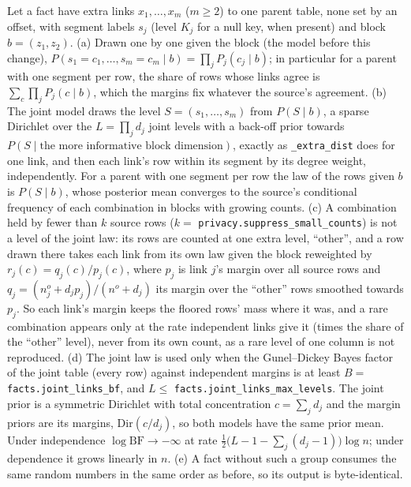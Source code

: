 \setcounter{proposition}{1869}
\begin{proposition}\label{prop:rolelinks}
Let a fact have extra links $x_1,\dots,x_m$ ($m\ge2$) to one parent table, none set by an offset, with segment labels $s_j$ (level $K_j$ for a null key, when present) and block $b=(z_1,z_2)$. (a) Drawn one by one given the block (the model before this change), $P(s_1=c_1,\dots,s_m=c_m\mid b)=\prod_j P_j(c_j\mid b)$; in particular for a parent with one segment per row, the share of rows whose links agree is $\sum_c\prod_j P_j(c\mid b)$, which the margins fix whatever the source's agreement. (b) The joint model draws the level $S=(s_1,\dots,s_m)$ from $P(S\mid b)$, a sparse Dirichlet over the $L=\prod_j d_j$ joint levels with a back-off prior towards $P(S\mid\text{the more informative block dimension})$, exactly as \texttt{\_extra\_dist} does for one link, and then each link's row within its segment by its degree weight, independently. For a parent with one segment per row the law of the rows given $b$ is $P(S\mid b)$, whose posterior mean converges to the source's conditional frequency of each combination in blocks with growing counts. (c) A combination held by fewer than $k$ source rows ($k=$ \texttt{privacy.suppress\_small\_counts}) is not a level of the joint law: its rows are counted at one extra level, ``other'', and a row drawn there takes each link from its own law given the block reweighted by $r_j(c)=q_j(c)/p_j(c)$, where $p_j$ is link $j$'s margin over all source rows and $q_j=(n^{o}_j+d_jp_j)/(n^{o}+d_j)$ its margin over the ``other'' rows smoothed towards $p_j$. So each link's margin keeps the floored rows' mass where it was, and a rare combination appears only at the rate independent links give it (times the share of the ``other'' level), never from its own count, as a rare level of one column is not reproduced. (d) The joint law is used only when the Gunel--Dickey Bayes factor of the joint table (every row) against independent margins is at least $B=$ \texttt{facts.joint\_links\_bf}, and $L\le$ \texttt{facts.joint\_links\_max\_levels}. The joint prior is a symmetric Dirichlet with total concentration $c=\sum_j d_j$ and the margin priors are its margins, $\mathrm{Dir}(c/d_j)$, so both models have the same prior mean. Under independence $\log\mathrm{BF}\to-\infty$ at rate $\tfrac12\big(L-1-\sum_j(d_j-1)\big)\log n$; under dependence it grows linearly in $n$. (e) A fact without such a group consumes the same random numbers in the same order as before, so its output is byte-identical.
\end{proposition}
